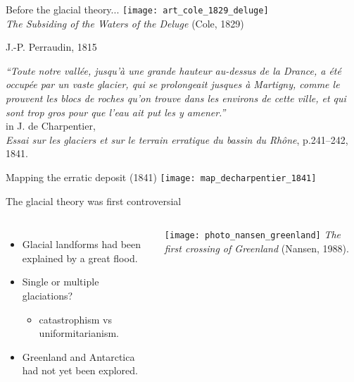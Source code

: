     \begin{frame}{Before the glacial theory...}
      \texttt{[image: art\_cole\_1829\_deluge]}\\
      \emph{The Subsiding of the Waters of the Deluge} (Cole, 1829)
    \end{frame}

    \begin{frame}{}
      J.-P. Perraudin, 1815\\
      \bigskip
      \par\emph{``Toute notre vallée, jusqu'à une grande hauteur au-dessus de la
              Drance, a été occupée par un vaste glacier, qui se prolongeait
              jusques à Martigny, comme le prouvent les blocs de roches qu'on
              trouve dans les environs de cette ville, et qui sont trop gros
              pour que l'eau ait put les y amener.''}\\
      \bigskip
      in J. de Charpentier,\\
      \emph{Essai sur les glaciers et sur le terrain erratique
            du bassin du Rhône},
      p.241--242, 1841.
    \end{frame}

    \begin{frame}{Mapping the erratic deposit (1841)}
      \texttt{[image: map\_decharpentier\_1841]}
    \end{frame}

    \begin{frame}{The glacial theory was first controversial}
      \begin{columns}
        \column{60mm}
          \begin{itemize}
            \item Glacial landforms had been explained by a great flood.
            \pause\bigskip
            \item Single or multiple glaciations?
              \begin{itemize}
                \item catastrophism vs uniformitarianism.
              \end{itemize}
            \pause\bigskip
            \item Greenland and Antarctica had not yet been explored.
          \end{itemize}
        \column{60mm}
          \texttt{[image: photo\_nansen\_greenland]}
          \emph{The first crossing of Greenland} (Nansen, 1988).
      \end{columns}
    \end{frame}

